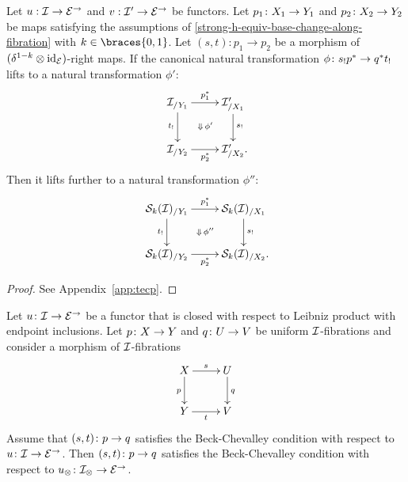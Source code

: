 \documentclass[reqno,10pt,a4paper,oneside]{amsart}
\begin{document}
\begin{lemma} \label{strong-h-equiv-base-change-along-fibration-BC}
Let $u : \cal{I} \to \catE^\to$ and $v : \cal{I}' \to \catE^\to$ be functors.
Let $p_1 \co X_1 \to Y_1$ and $p_2 \co X_2 \to Y_2$ be maps satisfying the assumptions of \cref{strong-h-equiv-base-change-along-fibration} with $k \in \braces{0, 1}$.
Let $(s, t) : p_1 \to p_2$ be a morphism of $(\kcylinv \otimes \id_\catE)$-right maps.
If the canonical natural transformation $\phi \co s_! p^* \to q^* t_!$ lifts to a natural transformation $\phi'$:
\begin{equation*} %
\begin{gathered}
\xymatrix{
  \cal{I}_{/Y_1}
  \ar[r]^{p_1^*}
  \ar[d]_{t_!}
  \ar@{}[dr]|{\Downarrow \, \phi'}
&
  \cal{I}_{/X_1}'
  \ar[d]^{s_!}
\\
  \cal{I}_{/Y_2}
  \ar[r]_{p_2^*}
&
  \cal{I}_{/X_2}'
\rlap{.}}
\end{gathered}
\end{equation*}
Then it lifts further to a natural transformation $\phi''$:
\begin{equation*} %
\begin{gathered}
\xymatrix{
  \cal{S}_k(\cal{I})_{/Y_1}
  \ar[r]^{p_1^*}
  \ar[d]_{t_!}
  \ar@{}[dr]|{\Downarrow \, \phi''}
&
  \cal{S}_k(\cal{I})_{/X_1}
  \ar[d]^{s_!}
\\
  \cal{S}_k(\cal{I})_{/Y_2}
  \ar[r]_{p_2^*}
&
  \cal{S}_k(\cal{I})_{/X_2}
\rlap{.}}
\end{gathered}
\end{equation*}
\end{lemma}


\begin{proof}
See Appendix~\ref{app:tecp}.
\end{proof}

\begin{theorem} \label{thm:beck-chevalley-unif}
Let $u \co \cal{I} \to \cal{E}^\to$ be a functor that is closed with respect to Leibniz product with endpoint inclusions.
Let $p \co X \to Y$ and $q \co U \to V$ be uniform $\cal{I}$-fibrations and consider a morphism of $\cal{I}$-fibrations
\[
\xymatrix{
X \ar[r]^s \ar[d]_{p} & U \ar[d]^{q} \\
Y \ar[r]_t & V}
\]
Assume that $(s,t) \co p \to q$ satisfies the Beck-Chevalley condition with respect to $u \co \cal{I} \to \cal{E}^\to$.
Then $(s,t) \co p \to q$ satisfies the Beck-Chevalley condition with respect to $u_\otimes \co \cal{I}_\otimes \to \cal{E}^\to$.\end{theorem}
\end{document}

